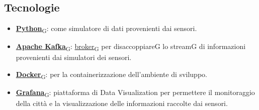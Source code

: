 \subsection{Tecnologie}
\begin{itemize}
    \item \href{https://7last.github.io/docs/rtb/documentazione-interna/glossario\#python}{\textbf{Python}\textsubscript{G}}: come simulatore di dati provenienti dai sensori.
    \item \href{https://7last.github.io/docs/rtb/documentazione-interna/glossario\#apache-kafka}{\textbf{Apache Kafka}\textsubscript{G}}: \href{https://7last.github.io/docs/rtb/documentazione-interna/glossario\#broker}{broker\textsubscript{G}} per disaccoppiareG lo streamG di informazioni provenienti dai simulatori dei sensori.
    \item \href{https://7last.github.io/docs/rtb/documentazione-interna/glossario\#docker}{\textbf{Docker}\textsubscript{G}}: per la containerizzazione dell'ambiente di sviluppo.
    \item \href{https://7last.github.io/docs/rtb/documentazione-interna/glossario\#grafana}{\textbf{Grafana}\textsubscript{G}}: piattaforma di Data Visualization per permettere il monitoraggio della città e la visualizzazione delle informazioni raccolte dai sensori.
    
\end{itemize}
